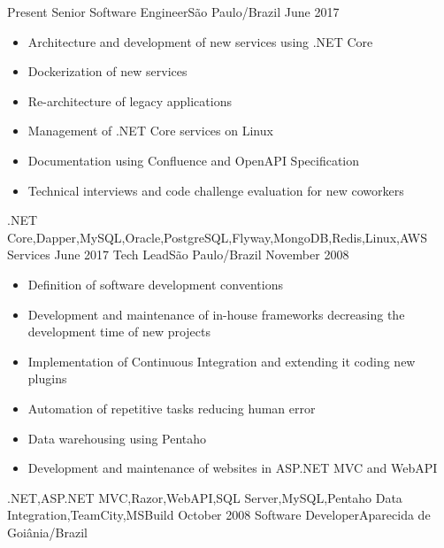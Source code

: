 
\begin{experiences}
  \experience
    {Present}   {Senior Software Engineer}{}{São Paulo/Brazil}
    {June 2017} {
                  \begin{itemize}
                    \item Architecture and development of new services using .NET Core
                    \item Dockerization of new services
                    \item Re-architecture of legacy applications
                    \item Management of .NET Core services on Linux
                    \item Documentation using Confluence and OpenAPI Specification
                    \item Technical interviews and code challenge evaluation for new coworkers
                  \end{itemize}
                }
                {.NET Core,Dapper,MySQL,Oracle,PostgreSQL,Flyway,MongoDB,Redis,Linux,AWS Services}
  \emptySeparator
  \experience
    {June 2017}     {Tech Lead}{}{São Paulo/Brazil}
    {November 2008} {
                      \begin{itemize}
                        \item Definition of software development conventions
                        \item Development and maintenance of in-house frameworks decreasing the development time of new projects
                        \item Implementation of Continuous Integration and extending it coding new plugins
                        \item Automation of repetitive tasks reducing human error
                        \item Data warehousing using Pentaho
                        \item Development and maintenance of websites in ASP.NET MVC and WebAPI
                      \end{itemize}
                    }
                    {.NET,ASP.NET MVC,Razor,WebAPI,SQL Server,MySQL,Pentaho Data Integration,TeamCity,MSBuild}
  \emptySeparator
  \experience
    {October 2008} {Software Developer}{}{Aparecida de Goiânia/Brazil}

\end{experiences}
